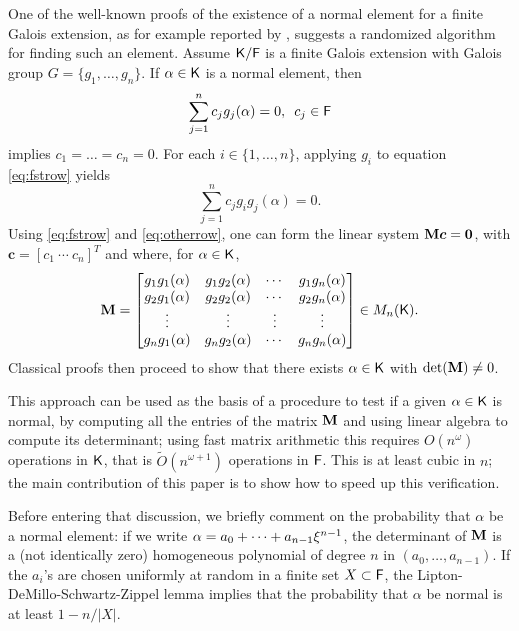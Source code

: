 One of the well-known proofs of the existence of a normal element for a
finite Galois extension, as for example reported by \citet[Theorem 6.13.1]{Lang}, suggests a randomized
algorithm for finding such an element. Assume ${\mathsf{K}}/{\mathsf{F}}$ is a finite Galois
extension with Galois group $G = \lbrace g_1 , \ldots , g_n \rbrace$. If
$\alpha \in {\mathsf{K}}$ is a normal element, then
\begin{equation}
  \label{eq:fstrow}
  \sum_{j=1}^n 
  c_j g_j(\alpha)=0, \,\,\, c_j \in {\mathsf{F}} 
\end{equation} 
implies $c_1 =\dots=c_n = 0$. For each
$i \in \lbrace 1, \ldots , n\rbrace$, applying $g_i$ to equation
\eqref{eq:fstrow} yields
\begin{equation} \label{eq:otherrow} \sum_{j=1}^n c_j g_i g_j(\alpha)=0.
\end{equation}
Using \eqref{eq:fstrow} and \eqref{eq:otherrow}, one can form the linear
system $\mat{M}\boldsymbol{c} = \textbf{0}$,
with $\boldsymbol{c} = [ c_1~ \cdots~c_n]^T$ and
where, for $\alpha\in{\mathsf{K}}$,
\begin{equation}\label{eqdef:M}
  \mat M =
  \begin{bmatrix}
    g_1 g_1(\alpha) & g_1 g_2(\alpha) & \cdots & g_1 g_n(\alpha) \\
    g_2 g_1(\alpha) & g_2 g_2(\alpha) & \cdots & g_2 g_n(\alpha) \\
    \vdots		& \vdots	& \vdots & \vdots \\
    g_n g_1(\alpha) & g_n g_2(\alpha) & \cdots & g_n g_n(\alpha) \\
  \end{bmatrix} \in M_n(\K).
\end{equation}
Classical proofs then proceed to show that there exists $\alpha \in {\mathsf{K}}$
with $\det(\mat M)\neq 0$.
 
This approach can be used as the basis of a procedure to test if a
given $\alpha\in{\mathsf{K}}$ is normal, by computing all the entries of the
matrix $\mat M$ and using linear algebra to compute its determinant;
using fast matrix arithmetic this requires $O(n^\omega)$ operations in
${\mathsf{K}}$, that is $\tilde{O}(n^{\omega+1})$ operations in ${\mathsf{F}}$. This is at
least cubic in $n$; the main contribution of this paper is to show how
to speed up this verification.
 
Before entering that discussion, we briefly comment on the probability
that $\alpha$ be a normal element: if we write $\alpha = a_0 + \cdots
+ a_{n-1} \xi^{n-1}$, the determinant of $\mat M$ is a
(not identically zero) homogeneous polynomial of degree $n$ in
$(a_0,\dots,a_{n-1})$. If the $a_i$'s are chosen uniformly at random
in a finite set $X \subset {\mathsf{F}}$, the Lipton-DeMillo-Schwartz-Zippel lemma
implies that the probability that $\alpha$ be normal is at least
$1-n/|X|$.


